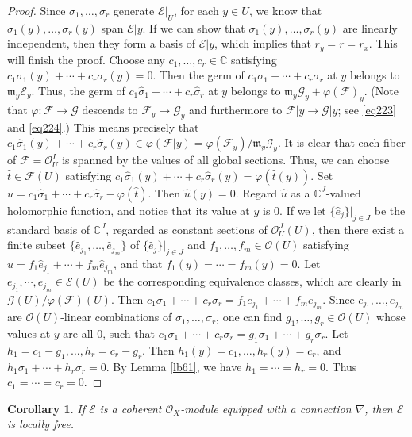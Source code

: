 \documentclass[12pt,a4paper,notitlepage]{report}
\theoremstyle{definition}
\theoremstyle{plain}
\newtheorem{co}[df]{Corollary}
\newcommand{\fk}{\mathfrak}
\newcommand{\wht}{\widehat}
\newcommand{\scr}{\mathscr}
\newcommand{\Cbb}{\mathbb C}
\numberwithin{equation}{section}
\begin{document}
\begin{proof}
Since $\sigma_1,\dots,\sigma_r$ generate   $\scr E|_U$, for each $y\in U$, we know that $\sigma_1(y),\dots,\sigma_r(y)$ span $\scr E|y$. If we can show that $\sigma_1(y),\dots,\sigma_r(y)$ are linearly independent, then they form a basis of $\scr E|y$, which implies that $r_y=r=r_x$. This will finish the proof. Choose any $c_1,\dots,c_r\in\Cbb$ satisfying  $c_1\sigma_1(y)+\cdots+c_r\sigma_r(y)=0$. Then the germ of $c_1\sigma_1+\cdots+c_r\sigma_r$ at $y$ belongs to $\fk m_y\scr E_y$. Thus, the germ of $c_1\wht \sigma_1+\cdots+c_r\wht \sigma_r$ at $y$ belongs to $\fk m_y\scr G_y+\varphi(\scr F)_y$. (Note that $\varphi:\scr F\rightarrow\scr G$ descends to $\scr F_y\rightarrow \scr G_y$ and furthermore to $\scr F|y\rightarrow\scr G|y$; see \eqref{eq223} and \eqref{eq224}.) This means precisely that $c_1\wht \sigma_1(y)+\cdots+c_r\wht \sigma_r(y)\in\varphi(\scr F|y)=\varphi(\scr F_y)/\fk m_y\scr G_y$. It is clear that each fiber of $\scr F=\scr O_U^I$ is spanned by the values of all global sections. Thus, we can choose $\wht t\in\scr F(U)$ satisfying $c_1\wht \sigma_1(y)+\cdots+c_r\wht \sigma_r(y)=\varphi(\wht t(y))$. Set $\wht u=c_1\wht \sigma_1+\cdots+c_r\wht \sigma_r-\varphi(\wht t)$. Then $\wht u(y)=0$. Regard $\wht u$ as a $\Cbb^J$-valued holomorphic function, and notice that its value at $y$ is $0$. If we let $\{\wht e_j\}|_{j\in J}$ be the standard basis of $\Cbb^J$, regarded as constant sections of $\scr O_U^J(U)$, then there exist a finite subset $\{\wht e_{j_1},\dots,\wht e_{j_m}\}$ of $\{\wht e_j\}|_{j\in J}$ and $f_1,\dots,f_m\in\scr O(U)$ satisfying $\wht u=f_1\wht e_{j_1}+\cdots+f_m\wht e_{j_m}$, and that $f_1(y)=\cdots=f_m(y)=0$. Let $e_{j_1},\cdots,e_{j_m}\in \scr E(U)$ be the corresponding equivalence classes, which are clearly in $\scr G(U)/\varphi(\scr F)(U)$. Then $c_1\sigma_1+\cdots+c_r\sigma_r=f_1e_{j_1}+\cdots+f_me_{j_m}$. Since  $e_{j_1},\dots,e_{j_m}$ are $\scr O(U)$-linear combinations of $\sigma_1,\dots,\sigma_r$, one can find $g_1,\dots,g_r\in\scr O(U)$ whose values at $y$ are all $0$, such that $c_1\sigma_1+\cdots+c_r\sigma_r=g_1\sigma_1+\cdots+g_r\sigma_r$. Let $h_1=c_1-g_1,\dots,h_r=c_r-g_r$. Then $h_1(y)=c_1,\dots,h_r(y)=c_r$, and $h_1\sigma_1+\cdots+h_r\sigma_r=0$. By Lemma \ref{lb61}, we have $h_1=\cdots=h_r=0$. Thus $c_1=\cdots=c_r=0$.
\end{proof}


\begin{co}
If $\scr E$ is a coherent $\scr O_X$-module equipped with a connection $\nabla$, then $\scr E$ is locally free.
\end{co}
\end{document}
